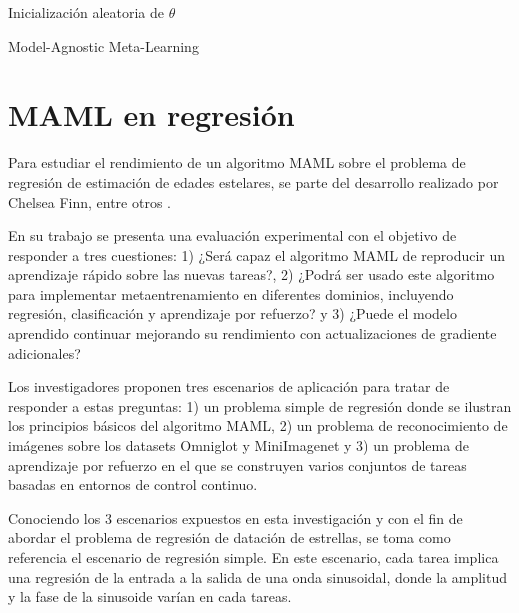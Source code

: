 \vspace{1cm}
\begin{algorithm}[H]
  Inicialización aleatoria de $\theta$\;
\caption{Model-Agnostic Meta-Learning}
\end{algorithm}



\section{MAML en regresión}

Para estudiar el rendimiento de un algoritmo MAML sobre el problema de regresión de estimación de edades estelares, se parte del desarrollo realizado por Chelsea Finn, entre otros \cite{finn2017modelagnostic}. 

En su trabajo se presenta una evaluación experimental con el objetivo de responder a tres cuestiones: 1) ¿Será capaz el algoritmo MAML de reproducir un aprendizaje rápido sobre las nuevas tareas?, 2) ¿Podrá ser usado este algoritmo para implementar metaentrenamiento en diferentes dominios, incluyendo regresión, clasificación y aprendizaje por refuerzo? y 3) ¿Puede el modelo aprendido continuar mejorando su rendimiento con actualizaciones de gradiente adicionales?

Los investigadores proponen tres escenarios de aplicación para tratar de responder a estas preguntas: 1) un problema simple de regresión donde se ilustran los principios básicos del algoritmo MAML, 2) un problema de reconocimiento de imágenes sobre los datasets Omniglot y MiniImagenet y 3) un problema de aprendizaje por refuerzo en el que se construyen varios conjuntos de tareas basadas en entornos de control continuo.

Conociendo los 3 escenarios expuestos en esta investigación y con el fin de abordar el problema de regresión de datación de estrellas, se toma como referencia el escenario de regresión simple. En este escenario, cada tarea implica una regresión de la entrada a la salida de una onda sinusoidal, donde la amplitud y la fase de la sinusoide varían en cada tareas.

